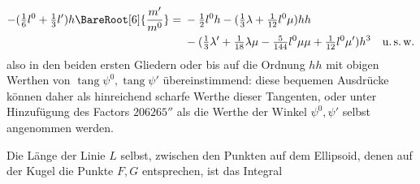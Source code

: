 \[
\begin{aligned}
-(\tfrac{1}{6}l^0+\tfrac{1}{3}l')h\BareRoot[6]{\frac{m'}{m^0}}={}&-\tfrac{1}{2}l^0h-(\tfrac{1}{3}\lambda+\tfrac{1}{12}l^0\mu)hh\\
&-(\tfrac{1}{3}\lambda'+\tfrac{1}{18}\lambda\mu-\tfrac{5}{144}l^0\mu\mu+\tfrac{1}{12}l^0\mu')h^3\quad\text{u.\,s.\,w.}
\end{aligned}
\]
also in den beiden ersten Gliedern oder bis auf die Ordnung \(hh\) mit obigen Werthen von \(\operatorname{tang}\psi^0,\operatorname{tang}\psi'\) übereinstimmend: diese bequemen Ausdrücke können daher als hinreichend scharfe Werthe dieser Tangenten, oder unter Hinzufügung des Factors \(206265''\) als die Werthe der Winkel \(\psi^0,\psi'\) selbst angenommen werden.

Die Länge der Linie \(L\) selbst, zwischen den Punkten auf dem Ellipsoid, denen auf der Kugel die Punkte \(F,G\) entsprechen, ist das Integral
